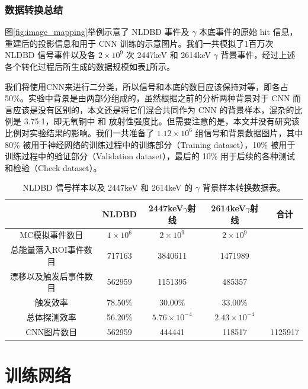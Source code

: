 \subsubsection{数据转换总结}

图\ref{fig:image_mapping}举例示意了 NLDBD 事件及 $\gamma$ 本底事件的原始 hit 信息，重建后的投影信息和用于 CNN 训练的示意图片。我们一共模拟了1百万次 NLDBD 信号事件以及各 $2\times10^9$ 次
 2447keV 和 2614keV $\gamma$ 背景事件，经过上述各个转化过程后所生成的数据规模如表\ref{tab:convert}所示。

我们将使用CNN来进行二分类，所以信号和本底的数目应该保持对等，即各占 50\%。实验中背景是由两部分组成的，虽然根据之前的分析两种背景对于 CNN 而言应该是没有区别的，本文还是将它们混合共同作为 CNN 的背景样本，混杂的比例是 3.75:1，即无氧铜中 \utte 和 \thttt 放射性强度比。但需要注意的是，本文并没有研究该比例对实验结果的影响。我们一共准备了 $1.12\times10^6$ 组信号和背景数据图片，其中 80\% 被用于神经网络的训练过程中的训练部分（Training dataset），10\% 被用于训练过程中的验证部分（Validation dataset），最后的 10\% 用于后续的各种测试和检验（Check dataset）。
        
\renewcommand\arraystretch{1.4}
\begin{table}
    \centering
    \begin{tabular*}{\textwidth}{@{\extracolsep{\fill}}ccccc}
        \hline
        \hline							
        	&	NLDBD	&	2447keV$\gamma$射线	&	2614keV$\gamma$射线	&	合计	\\
        \hline
        MC模拟事件数目	&	$1\times10^6$	&	$2\times10^9$	&	$2\times10^9$	&		\\
        总能量落入ROI事件数目	&	717163	&	3840611	&	1471989	&		\\
        漂移以及触发后事件数目	&	562959	&	1151395	&	485357	&		\\
        触发效率	&	78.50\%	&	30.00\%	&	33.00\%	&		\\
        总体探测效率	&	56.20\%	&	$5.76\times10^{-4}$	&	$2.43\times10^{-4}$	&		\\
        CNN图片数目	&	562959	&	444441	&	118517	&	1125917	\\
        \hline
        \hline
    \end{tabular*}
    \caption{NLDBD 信号样本以及 2447keV 和 2614keV 的 $\gamma$ 背景样本转换数据表。}
    \label{tab:convert}
  \end{table}

\section{训练网络}
\label{section:train}

